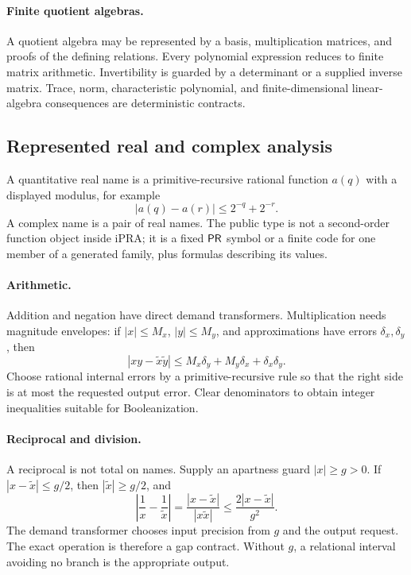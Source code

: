 \paragraph{Finite quotient algebras.}
A quotient algebra may be represented by a basis, multiplication matrices, and proofs of the defining
relations.  Every polynomial expression reduces to finite matrix arithmetic.  Invertibility is guarded by
a determinant or a supplied inverse matrix.  Trace, norm, characteristic polynomial, and finite-dimensional
linear-algebra consequences are deterministic contracts.

\subsection{Represented real and complex analysis}

A quantitative real name is a primitive-recursive rational function \(a(q)\) with a displayed modulus, for
example
\[
 |a(q)-a(r)|\le 2^{-q}+2^{-r}.
\]
A complex name is a pair of real names.  The public type is not a second-order function object inside iPRA;
it is a fixed \(\mathsf{PR}\) symbol or a finite code for one member of a generated family, plus formulas describing
its values.

\paragraph{Arithmetic.}
Addition and negation have direct demand transformers.  Multiplication needs magnitude envelopes:
if \(|x|\le M_x\), \(|y|\le M_y\), and approximations have errors \(\delta_x,\delta_y\), then
\[
 |xy-\tilde x\tilde y|
 \le M_x\delta_y+M_y\delta_x+\delta_x\delta_y.
\]
Choose rational internal errors by a primitive-recursive rule so that the right side is at most the requested
output error.  Clear denominators to obtain integer inequalities suitable for Booleanization.

\paragraph{Reciprocal and division.}
A reciprocal is not total on names.  Supply an apartness guard \(|x|\ge g>0\).  If
\(|x-\tilde x|\le g/2\), then \(|\tilde x|\ge g/2\), and
\[
 \left|\frac1x-\frac1{\tilde x}\right|
 =\frac{|x-\tilde x|}{|x\tilde x|}
 \le \frac{2|x-\tilde x|}{g^2}.
\]
The demand transformer chooses input precision from \(g\) and the output request.  The exact operation is
therefore a gap contract.  Without \(g\), a relational interval avoiding no branch is the appropriate
output.

